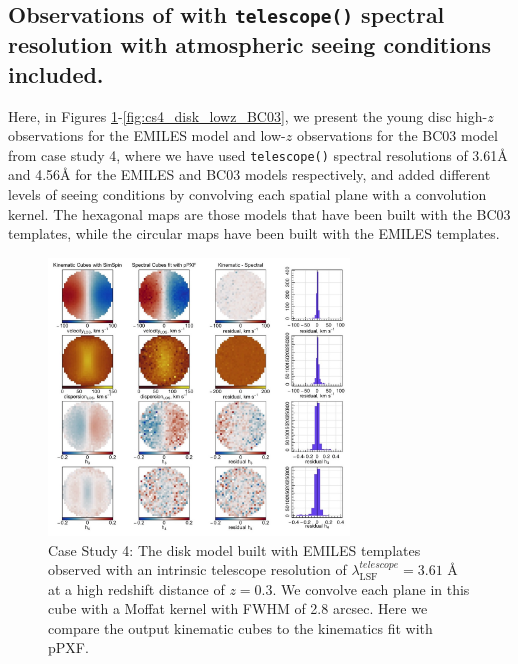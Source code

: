 \documentclass[
  journal=pasa,
  manuscript=research-paper, %
  year=2020,
  volume=37,
]{cup-journal}
\newcommand{\telescope}[1]{\texttt{telescope()}#1}
\begin{document}
\FloatBarrier

\subsection{Observations of with \telescope{} spectral resolution with atmospheric seeing conditions included.}
\label{app:cs4}

Here, in Figures \ref{fig:cs4_disk_highz_EMILES}-\ref{fig:cs4_disk_lowz_BC03}, we present the young disc high-$z$ observations for the EMILES model and low-$z$ observations for the BC03 model from case study 4, where we have used \telescope{} spectral resolutions of 3.61\AA{} and 4.56\AA{} for the EMILES and BC03 models respectively, and added different levels of seeing conditions by convolving each spatial plane with a convolution kernel. The hexagonal maps are those models that have been built with the BC03 templates, while the circular maps have been built with the EMILES templates. 

\begin{figure}
    \centering
    \includegraphics[keepaspectratio, width=8cm]{Figures/cs4_disk_velocities_highz_fwhm_blur_EMILES.jpeg}
    \caption{Case Study 4: The disk model built with EMILES templates observed with an intrinsic telescope resolution of  $\lambda_{\text{LSF}}^{telescope} = 3.61$ \AA{} at a high redshift distance of $z = 0.3$. We convolve each plane in this cube with a Moffat kernel with FWHM of 2.8 arcsec. Here we compare the output kinematic cubes to the kinematics fit with pPXF.}
    \label{fig:cs4_disk_highz_EMILES}
\end{figure}
\end{document}
